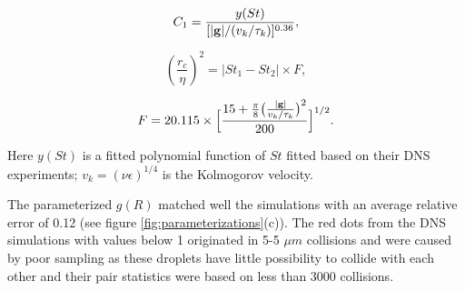 \begin{equation}
C_1=\frac{y(St)}{[|{\bf g}|/(v_k/\tau_k)]^{0.36}},
\end{equation}

\begin{equation}
(\frac{r_c}{\eta})^2=|St_1-St_2|\times F,
\end{equation}

\begin{equation}
F=20.115 \times \Big[{\frac{15 + \frac{\pi}{8}\big(\frac{|\bf{g}|}{v_k/\tau_k}\big)^2}{200}}\Big]^{1/2}.
\end{equation}

Here $y(St)$ is a fitted polynomial function of $St$ fitted based on their DNS experiments; $v_k = (\nu\epsilon)^{1/4}$ is the Kolmogorov velocity. 

The parameterized $g(R)$ matched well the simulations with an average relative error of 0.12 (see figure \ref{fig:parameterizations}(c)). The red dots from the DNS simulations with values below 1 originated in 5-5 $\mu m$ collisions and were caused by poor sampling as these droplets have little possibility to collide with each other and their pair statistics were based on less than 3000 collisions. 

